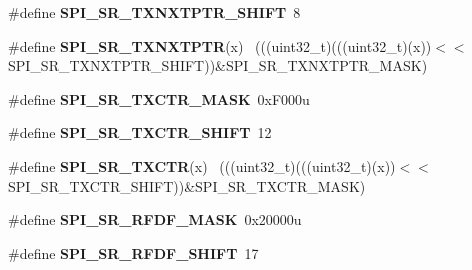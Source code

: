 \begin{DoxyCompactItemize}
\item 
\hypertarget{group___s_p_i___register___masks_ga129ad514464ae667c6d78ee9840236d5}{}\#define {\bfseries S\+P\+I\+\_\+\+S\+R\+\_\+\+T\+X\+N\+X\+T\+P\+T\+R\+\_\+\+S\+H\+I\+F\+T}~8\label{group___s_p_i___register___masks_ga129ad514464ae667c6d78ee9840236d5}

\item 
\hypertarget{group___s_p_i___register___masks_gadbd95ad4fab6a131bb9f36c88f34e64b}{}\#define {\bfseries S\+P\+I\+\_\+\+S\+R\+\_\+\+T\+X\+N\+X\+T\+P\+T\+R}(x)                                          ~(((uint32\+\_\+t)(((uint32\+\_\+t)(x))$<$$<$S\+P\+I\+\_\+\+S\+R\+\_\+\+T\+X\+N\+X\+T\+P\+T\+R\+\_\+\+S\+H\+I\+F\+T))\&S\+P\+I\+\_\+\+S\+R\+\_\+\+T\+X\+N\+X\+T\+P\+T\+R\+\_\+\+M\+A\+S\+K)\label{group___s_p_i___register___masks_gadbd95ad4fab6a131bb9f36c88f34e64b}

\item 
\hypertarget{group___s_p_i___register___masks_gaba58e43f829f6e6103933bf570e9feb7}{}\#define {\bfseries S\+P\+I\+\_\+\+S\+R\+\_\+\+T\+X\+C\+T\+R\+\_\+\+M\+A\+S\+K}~0x\+F000u\label{group___s_p_i___register___masks_gaba58e43f829f6e6103933bf570e9feb7}

\item 
\hypertarget{group___s_p_i___register___masks_gad7fc9ecdd51f12aabb492271648e133b}{}\#define {\bfseries S\+P\+I\+\_\+\+S\+R\+\_\+\+T\+X\+C\+T\+R\+\_\+\+S\+H\+I\+F\+T}~12\label{group___s_p_i___register___masks_gad7fc9ecdd51f12aabb492271648e133b}

\item 
\hypertarget{group___s_p_i___register___masks_gabdf4b9089966cd6a6ddfbcefa762809a}{}\#define {\bfseries S\+P\+I\+\_\+\+S\+R\+\_\+\+T\+X\+C\+T\+R}(x)                                                ~(((uint32\+\_\+t)(((uint32\+\_\+t)(x))$<$$<$S\+P\+I\+\_\+\+S\+R\+\_\+\+T\+X\+C\+T\+R\+\_\+\+S\+H\+I\+F\+T))\&S\+P\+I\+\_\+\+S\+R\+\_\+\+T\+X\+C\+T\+R\+\_\+\+M\+A\+S\+K)\label{group___s_p_i___register___masks_gabdf4b9089966cd6a6ddfbcefa762809a}

\item 
\hypertarget{group___s_p_i___register___masks_ga71c5bf00b7a6fdd6df9f46068d43cc90}{}\#define {\bfseries S\+P\+I\+\_\+\+S\+R\+\_\+\+R\+F\+D\+F\+\_\+\+M\+A\+S\+K}~0x20000u\label{group___s_p_i___register___masks_ga71c5bf00b7a6fdd6df9f46068d43cc90}

\item 
\hypertarget{group___s_p_i___register___masks_gab969720c704e5da43908b804881bd512}{}\#define {\bfseries S\+P\+I\+\_\+\+S\+R\+\_\+\+R\+F\+D\+F\+\_\+\+S\+H\+I\+F\+T}~17\label{group___s_p_i___register___masks_gab969720c704e5da43908b804881bd512}


\end{DoxyCompactItemize}
